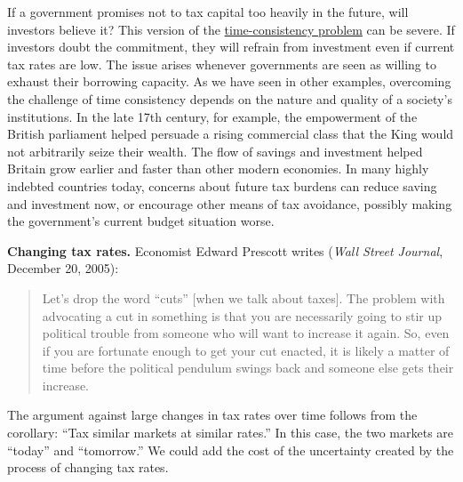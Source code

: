 If a government promises not to tax capital too heavily in the future,
will investors believe it?
This version of the \hyperref[sec:time_cons]{time-consistency problem} can be severe.
If investors doubt the commitment, they
will refrain from investment even if current tax rates are low. The issue arises
whenever governments are seen as willing to exhaust their borrowing capacity.
As we have seen in other examples, overcoming the challenge of time
consistency depends on the nature and quality of a society's
institutions. In the late 17th century, for example,
the empowerment of the British parliament helped persuade a
rising commercial class that the King would not arbitrarily
seize their wealth. The flow of savings and investment helped Britain
grow earlier and faster than other modern economies.
In many highly indebted countries today,
concerns about future tax burdens can reduce saving and investment now,
or encourage other means of tax avoidance,
possibly making the government's current budget situation worse.

\begin{comment}
{\it Taxes on labor income.\/}
In our diagram, a tax on labor (collected from either firms or workers)
would discourage work in the same way it discourages other activities
(see Figure \ref{fig:tax}).
The issue here is how sensitive labor supply is to the tax rate.
If people work the same amount whether the tax rate is high or low,
then the social cost is zero.
If they work less when the tax is higher, then the cost is positive.
Generally the flatter the supply curve the higher the cost.
You can show this in the figure, but it takes good draftsmanship.

How sensitive is labor supply?  Somewhat.
The most sensitive components of labor supply
seem to be spouses in two-income households
(does one stay home, or take early retirement?)
and poor people (many of whom would lose
means-tested benefits if they worked).
\end{comment}


\textbf{Changing tax rates.}
Economist Edward Prescott writes
({\it Wall Street Journal\/}, December 20, 2005):
%
\begin{quote}
Let's drop the word ``cuts'' [when we talk about taxes].  The problem with advocating a cut in something is that you are necessarily going to stir up political trouble from someone who will want to increase it again.  So, even if you are fortunate enough to get your cut enacted, it is likely a matter of time before the political pendulum swings back and someone else gets their increase. \end{quote}
%
The argument against large changes in tax rates over time
follows from the corollary:  ``Tax similar markets at similar rates.''
In this case, the two markets are ``today'' and ``tomorrow.''
We could add the cost of the uncertainty created
by the process of changing tax rates.

